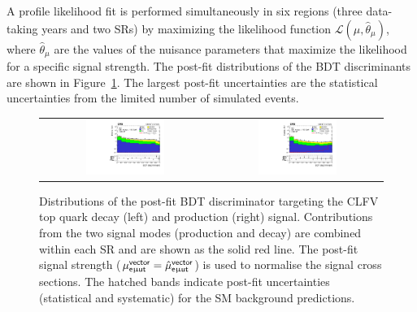 A profile likelihood fit is performed simultaneously in six regions (three data-taking years and two SRs) by maximizing the likelihood function $\mathcal{L}(\mu, \hat{\theta}_{\mu})$, where $\hat{\theta}_{\mu}$ are the values of the nuisance parameters that maximize the likelihood for a specific signal strength. The post-fit distributions of the \ac{BDT} discriminants are shown in Figure~\ref{fig:bdt_postfit_VecU}. The largest post-fit uncertainties are the statistical uncertainties from the limited number of simulated events.

\begin{figure}[tbh!]
 \begin{center}
 \begin{tabular}{cc}
 \includegraphics[width=0.48\textwidth]{figures/Part3/Results/BDT_TT_VecU}&
 \includegraphics[width=0.48\textwidth]{figures/Part3/Results/BDT_ST_VecU}\\
 \end{tabular}
 \caption{Distributions of the post-fit \ac{BDT} discriminator targeting the \ac{CLFV} top quark decay (left) and production (right) signal. Contributions from the two signal modes (production and decay) are combined within each \ac{SR} and are shown as the solid red line. The post-fit signal strength ($\mu_{\textsf{e}\upmu\textsf{{u}t}}^{\textsf{vector}}=\hat{\mu}_{\textsf{e}\upmu\textsf{{u}t}}^{\textsf{vector}}$) is used to normalise the signal cross sections. The hatched bands indicate post-fit uncertainties (statistical and systematic) for the SM background predictions.}
 \label{fig:bdt_postfit_VecU}
 \end{center}
\end{figure} 

